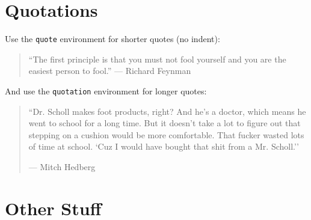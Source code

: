 \documentclass[12pt]{article}
\begin{document}
\section{Quotations}

Use the \verb|quote| environment for shorter quotes (no indent):
\begin{quote}
	``The first principle is that you must not fool yourself and you are the easiest 
	person to fool.'' --- Richard Feynman
\end{quote}
And use the \verb|quotation| environment for longer quotes:
\begin{quotation}
	``Dr. Scholl makes foot products, right? And he's a doctor, which means he went 
	to school for a long time. But it doesn't take a lot to figure out that stepping on a 
	cushion would be more comfortable. That fucker wasted lots of time at school. 
	`Cuz I would have bought that shit from a Mr. Scholl.''
	
	\hfill --- Mitch Hedberg
\end{quotation}

	
	
\section{Other Stuff}
	
	
 
	
\end{document}
